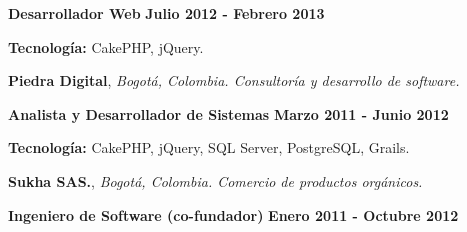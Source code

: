 \begin{outerlist}
\item[\FA \faAngleDoubleRight] \textbf{Desarrollador Web} \hfill
\textbf{Julio 2012 - Febrero 2013}
\end{outerlist}
% 
    \begin{innerlist}
\item \textbf{Tecnología:} CakePHP, jQuery.
    \end{innerlist}

\quarterblankline

\textbf{Piedra Digital},
\textit{Bogot\'a, Colombia. Consultoría y desarrollo de software.}

\begin{outerlist}
\item[\FA \faAngleDoubleRight] \textbf{Analista y Desarrollador de Sistemas}
\hfill
\textbf{Marzo 2011 - Junio 2012}
\end{outerlist}
% 
    \begin{innerlist}
\item \textbf{Tecnología:} CakePHP, jQuery, SQL Server, PostgreSQL, Grails.
    \end{innerlist}

\quarterblankline

\textbf{Sukha SAS.}, \textit{Bogot\'a, Colombia. Comercio de productos
orgánicos.}

\begin{outerlist}
\item[\FA \faAngleDoubleRight] \textbf{Ingeniero de Software (co-fundador)}
\hfill \textbf{Enero 2011 - Octubre 2012}
\end{outerlist}

